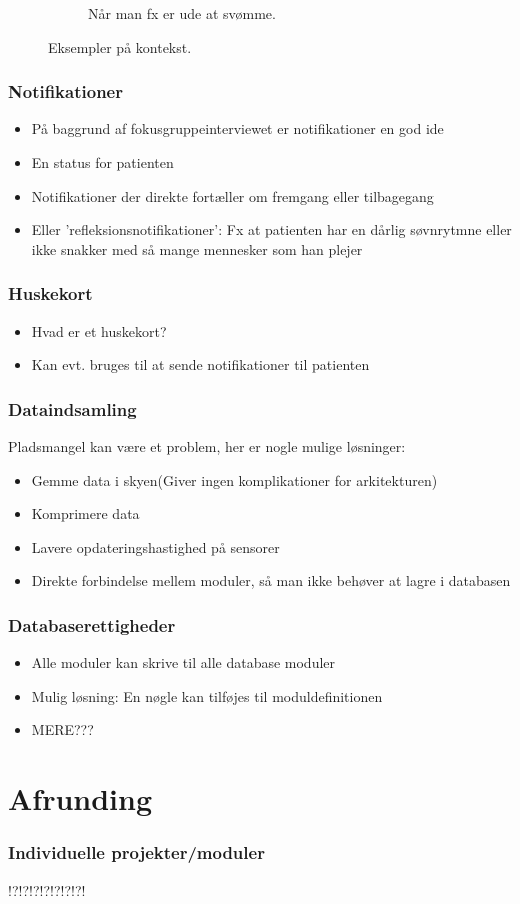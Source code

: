 \begin{frame}
\begin{figure}
\begin{subfigure}[b]{0.3\textwidth}
                \caption{Når man fx er ude at svømme.}
                \label{context:swimmer}
        \end{subfigure}
        \caption{Eksempler på kontekst.}\label{context}
\end{figure}
\end{frame}

\begin{frame}
\frametitle{Notifikationer}
\begin{itemize}
\item På baggrund af fokusgruppeinterviewet er notifikationer en god ide
\item En status for patienten
\item Notifikationer der direkte fortæller om fremgang eller tilbagegang
\item Eller 'refleksionsnotifikationer': Fx at patienten har en dårlig søvnrytmne eller ikke snakker med så mange mennesker som han plejer
\end{itemize}
\end{frame}

\begin{frame}
\frametitle{Huskekort}
\begin{itemize}
\item Hvad er et huskekort?
\item Kan evt. bruges til at sende notifikationer til patienten
\end{itemize}
\end{frame}

\begin{frame}
\frametitle{Dataindsamling}
Pladsmangel kan være et problem, her er nogle mulige løsninger:
\begin{itemize}
\item Gemme data i skyen(Giver ingen komplikationer for arkitekturen)
\item Komprimere data
\item Lavere opdateringshastighed på sensorer
\item Direkte forbindelse mellem moduler, så man ikke behøver at lagre i databasen
\end{itemize}
\end{frame}

\begin{frame}
\frametitle{Databaserettigheder}
\begin{itemize}
\item Alle moduler kan skrive til alle database moduler
\item Mulig løsning: En nøgle kan tilføjes til moduldefinitionen
\item MERE???
\end{itemize}
\end{frame}

\section{Afrunding}
\begin{frame}
\frametitle{Individuelle projekter/moduler}
!?!?!?!?!?!?!?!
\end{frame}
